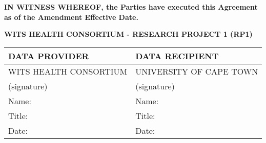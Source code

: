 \documentclass[12pt,letterpaper]{article}
\newcommand{\added}[1]{\textcolor{addcolor}{#1}}
\begin{document}
\vspace{0.5cm}

\textbf{IN WITNESS WHEREOF, the Parties have executed this Agreement as of the \added{Amendment} Effective Date.}

\begin{center}
\textbf{WITS HEALTH CONSORTIUM - RESEARCH PROJECT 1 (RP1)}
\end{center}

\begin{tabular}{|p{}|p{}|}
\hline
\textbf{DATA PROVIDER} & \textbf{DATA RECIPIENT} \\
\hline
WITS HEALTH CONSORTIUM & UNIVERSITY OF CAPE TOWN \\
\hline
(signature) & (signature) \\
\hline
Name: & Name: \\
\hline
Title: & Title: \\
\hline
Date: & Date: \\
\hline
\end{tabular}
\end{document}
